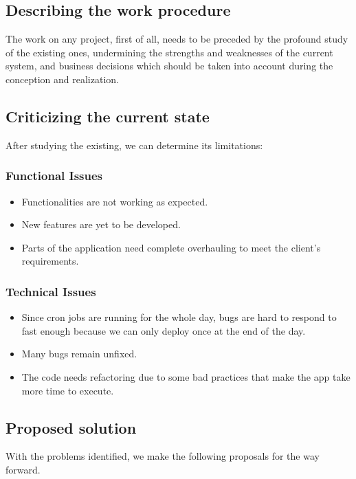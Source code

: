 \subsection{Describing the work procedure}
The work on any project, first of all, needs to be preceded by the profound study of the existing ones, undermining the strengths and weaknesses of the current system, and business decisions which should be taken into account during the conception and realization.
\subsection{Criticizing the current state}
After studying the existing, we can determine its limitations:
\subsubsection{Functional Issues}
\begin{itemize}
    \item Functionalities are not working as expected.
    \item New features are yet to be developed.
    \item Parts of the application need complete overhauling to meet the client's requirements.
\end{itemize}
\subsubsection{Technical Issues}
\begin{itemize}
    \item Since cron jobs are running for the whole day, bugs are hard to respond to fast enough because we can only deploy once at the end of the day.
    \item Many bugs remain unfixed.
    \item The code needs refactoring due to some bad practices that make the app take more time to execute.
\end{itemize}

\subsection{Proposed solution}
With the problems identified, we make the following proposals for the way forward.

